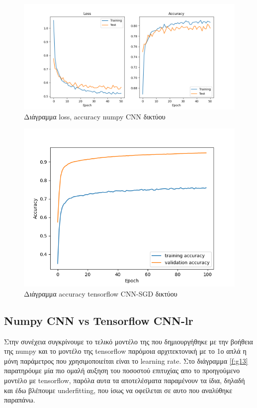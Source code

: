 \begin{figure}[ht]
	\centering
	\includegraphics[width=1\linewidth]{Results/40k_withoutdropout_conv_lr.png}
	\caption{ Διάγραμμα loss, accuracy numpy CNN δικτύου}
	\label{f:g10}	
\end{figure}



\begin{figure}[ht]
	\centering
	\includegraphics[width=1\linewidth]{Results/tensorflow_lr_moment_decay.png}
	\caption{ Διάγραμμα accuracy tensorflow CNN-SGD δικτύου}
	\label{f:g11}	
\end{figure}
\clearpage

\subsection{Numpy CNN vs Tensorflow CNN-lr}


Στην συνέχεια συγκρίνουμε το τελικό μοντέλο της που δημιουργήθηκε με την βοήθεια της numpy και το μοντέλο της tensorflow παρόμοια αρχιτεκτονική με το 1ο απλά η μόνη παράμετρος που χρησιμοποιείται είναι το learning rate. Στο διάγραμμα \ref{f:g13}
παρατηρόυμε μία πιο ομαλή αυξηση του ποσοστού επιτυχίας απο το προηγούμενο μοντέλο με tensorflow, παρόλα αυτα τα αποτελέσματα παραμένουν τα ίδια, δηλαδή και έδω βλέπουμε underfitting, που ίσως να οφείλεται σε αυτο που αναλύθηκε παραπάνω.

